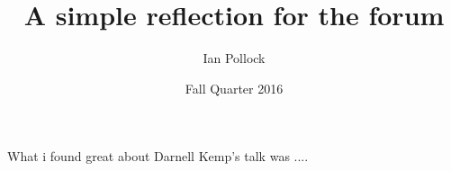 \documentclass[letterpaper]{article}
\title{A simple reflection for the forum}
\author{Ian Pollock}
\date{Fall Quarter 2016}
\begin{document}
\maketitle


What i found\parencite{massumi1995autonomy} great about Darnell Kemp's\parencite{LectureKemp} talk was ....



\printbibliography[title={References and Citations}]
\end{document}
